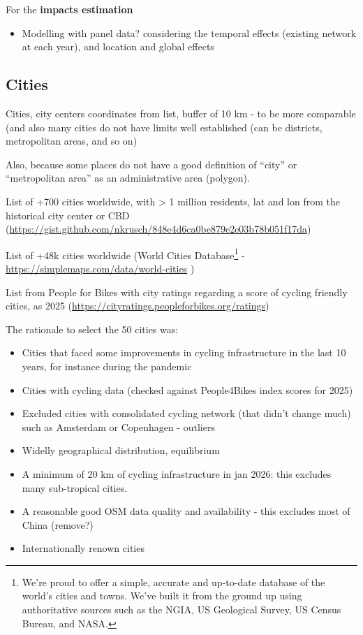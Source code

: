 \documentclass[
  sn-nature,
]{sn-jnl}
\providecommand{\tightlist}{%
  \setlength{\itemsep}{0pt}\setlength{\parskip}{0pt}}
\begin{document}
For the \textbf{impacts estimation}

\begin{itemize}
\tightlist
\item
  Modelling with panel data? considering the temporal effects (existing
  network at each year), and location and global effects
\end{itemize}

\subsection{Cities}\label{cities}

Cities, city centers coordinates from list, buffer of 10 km - to be more
comparable (and also many cities do not have limits well established
(can be districts, metropolitan areas, and so on)

Also, because some places do not have a good definition of ``city'' or
``metropolitan area'' as an administrative area (polygon).

List of +700 cities worldwide, with \textgreater{} 1 million residents,
lat and lon from the historical city center or CBD
(\url{https://gist.github.com/nkrusch/848e4d6ca0be879e2e03b78b051f17da})

List of +48k cities worldwide (World Cities Database\footnote{We're
  proud to offer a simple, accurate and up-to-date database of the
  world's cities and towns. We've built it from the ground up using
  authoritative sources such as the NGIA, US Geological Survey, US
  Census Bureau, and NASA.} -
\url{https://simplemaps.com/data/world-cities} )

List from People for Bikes with city ratings regarding a score of
cycling friendly cities, as 2025
(\url{https://cityratings.peopleforbikes.org/ratings})

The rationale to select the 50 cities was:

\begin{itemize}
\tightlist
\item
  Cities that faced some improvements in cycling infrastructure in the
  last 10 years, for instance during the pandemic
\item
  Cities with cycling data (checked against People4Bikes index scores
  for 2025)
\item
  Excluded cities with consolidated cycling network (that didn't change
  much) such as Amsterdam or Copenhagen - outliers
\item
  Widelly geographical distribution, equilibrium
\item
  A minimum of 20 km of cycling infrastructure in jan 2026: this
  excludes many sub-tropical cities.
\item
  A reasonable good OSM data quality and availability - this excludes
  most of China (remove?)
\item
  Internationally renown cities
\end{itemize}
\end{document}
